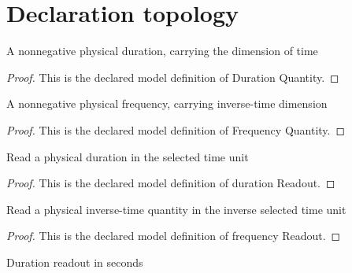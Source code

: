 \section{Declaration topology}
\begin{definition}
  \label{def:physics:phyx-mini-0504:phyxminiproblems-problemphyxmini0504-durationquantity}
  A nonnegative physical duration, carrying the dimension of time
\end{definition}
\begin{proof}
  This is the declared model definition of Duration Quantity.
\end{proof}
\begin{definition}
  \label{def:physics:phyx-mini-0504:phyxminiproblems-problemphyxmini0504-frequencyquantity}
  A nonnegative physical frequency, carrying inverse-time dimension
\end{definition}
\begin{proof}
  This is the declared model definition of Frequency Quantity.
\end{proof}
\begin{definition}
  \label{def:physics:phyx-mini-0504:phyxminiproblems-problemphyxmini0504-durationreadout}
  Read a physical duration in the selected time unit
\end{definition}
\begin{proof}
  This is the declared model definition of duration Readout.
\end{proof}
\begin{definition}
  \label{def:physics:phyx-mini-0504:phyxminiproblems-problemphyxmini0504-frequencyreadout}
  Read a physical inverse-time quantity in the inverse selected time unit
\end{definition}
\begin{proof}
  This is the declared model definition of frequency Readout.
\end{proof}
\begin{definition}
  \label{def:physics:phyx-mini-0504:phyxminiproblems-problemphyxmini0504-durationinseconds}
  Duration readout in seconds
\end{definition}
